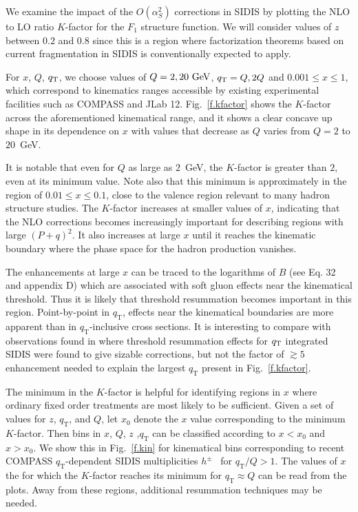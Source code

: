 \documentclass[prd,preprintnumbers,nofootinbib,superscriptaddress,onecolumn,preprint]{revtex4-1}
\newcommand\3[1]{\boldsymbol{#1}}
\newcommand{\Tsc}[2]{#1_{#2\text{T}}}
\newcommand{\fref}[1]{Fig.~\ref{f.#1}}
\begin{document}
We examine the impact of the $O(\alpha_S^2)$
corrections in SIDIS by plotting the NLO to LO ratio $K$-factor for
the $F_1$ structure function.
We will consider values of $z$ between $0.2$ and $0.8$ since this is 
a region where factorization theorems based on current
fragmentation in SIDIS is conventionally expected to apply.

For $x$, $Q$, $q_{\rm T}$, we choose values of $Q=2,20 {\rm~GeV}$, 
$q_{\rm T}=Q, 2Q$ and $0.001\le x \le 1$, which correspond to
kinematics ranges accessible by existing experimental facilities such
as COMPASS and JLab 12.
\fref{kfactor} shows the $K$-factor across the aforementioned kinematical range, and it 
shows a clear concave up shape 
in its dependence on $x$ with values that decrease as $Q$ varies from 
$Q = 2$ to $20$~GeV. 

It is notable that even for $Q$ as large as  $2$~GeV, the $K$-factor
is greater than $2$, even at its minimum value.
Note also that this minimum is approximately in the region of $0.01\le x \le0.1$, close to 
the valence region relevant to many hadron structure studies. 
%
The $K$-factor increases at smaller values of $x$, 
indicating that the NLO corrections becomes increasingly important 
for describing regions with large $(P+q)^2$.  
%
It also increases at large $x$ 
until it reaches the kinematic boundary where the phase space  
for the hadron production vanishes. 
%

The enhancements at large $x$ can be traced to the logarithms of $B$ (see Eq. 32
and appendix D) which are associated with soft gluon effects near the
kinematical threshold. Thus it is likely that threshold resummation 
becomes important in this region. Point-by-point in $\Tsc{q}{}$, effects near the
kinematical boundaries are more apparent than in $\Tsc{q}{}$-inclusive cross sections. 
It is interesting to compare with observations found in \cite{Anderle:2012rq} where 
threshold resummation effects for $q_{\rm T}$ integrated SIDIS were found to 
give sizable corrections, but not the factor of $\gtrsim 5$ enhancement needed to 
explain the largest $\Tsc{q}{}$ present in \fref{kfactor}.

The minimum in the $K$-factor is helpful for identifying regions in $x$
where ordinary fixed order treatments are most likely to be sufficient.  
Given a set of values for $z$, $\Tsc{q}{}$, and $Q$,  
let $x_{0}$ denote the $x$ value corresponding to the minimum $K$-factor.  Then
bins in  $x$, $Q$, $z$ ,$\Tsc{q}{}$ can be classified according to $x<x_{0}$
and $x>x_{0}$.  
We show this in \fref{kin} for kinematical bins corresponding to recent COMPASS
$\Tsc{q}{}$-dependent SIDIS multiplicities $h^{\pm}$~\cite{Aghasyan:2017ctw} for 
$\Tsc{q}{}/Q>1$. 
The values of $x$ the for which the $K$-factor reaches its 
minimum for $\Tsc{q}{} \approx Q$ can be read from the plots. Away from these regions, 
additional resummation techniques may be needed.
\end{document}
